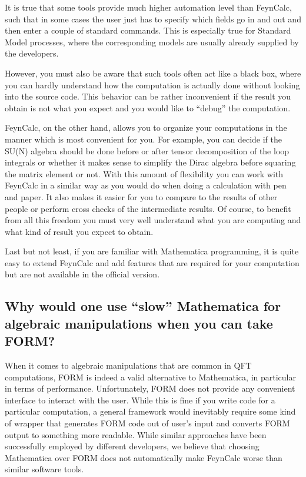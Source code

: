 \documentclass[../FeynCalcManual.tex]{subfiles}
\begin{document}
It is true that some tools provide much higher automation level than
FeynCalc, such that in some cases the user just has to specify which
fields go in and out and then enter a couple of standard commands. This
is especially true for Standard Model processes, where the corresponding
models are usually already supplied by the developers.

However, you must also be aware that such tools often act like a black
box, where you can hardly understand how the computation is actually
done without looking into the source code. This behavior can be rather
inconvenient if the result you obtain is not what you expect and you
would like to ``debug'' the computation.

FeynCalc, on the other hand, allows you to organize your computations in
the manner which is most convenient for you. For example, you can decide
if the SU(N) algebra should be done before or after tensor decomposition
of the loop integrals or whether it makes sense to simplify the Dirac
algebra before squaring the matrix element or not. With this amount of
flexibility you can work with FeynCalc in a similar way as you would do
when doing a calculation with pen and paper. It also makes it easier for
you to compare to the results of other people or perform cross checks of
the intermediate results. Of course, to benefit from all this freedom
you must very well understand what you are computing and what kind of
result you expect to obtain.

Last but not least, if you are familiar with Mathematica programming, it
is quite easy to extend FeynCalc and add features that are required for
your computation but are not available in the official version.

\subsection{Why would one use ``slow'' Mathematica for algebraic
manipulations when you can take
FORM?}\label{why-would-one-use-slow-mathematica-for-algebraic-manipulations-when-you-can-take-form}

When it comes to algebraic manipulations that are common in QFT
computations, FORM is indeed a valid alternative to Mathematica, in
particular in terms of performance. Unfortunately, FORM does not provide
any convenient interface to interact with the user. While this is fine
if you write code for a particular computation, a general framework
would inevitably require some kind of wrapper that generates FORM code
out of user's input and converts FORM output to something more readable.
While similar approaches have been successfully employed by different
developers, we believe that choosing Mathematica over FORM does not
automatically make FeynCalc worse than similar software tools.
\end{document}

